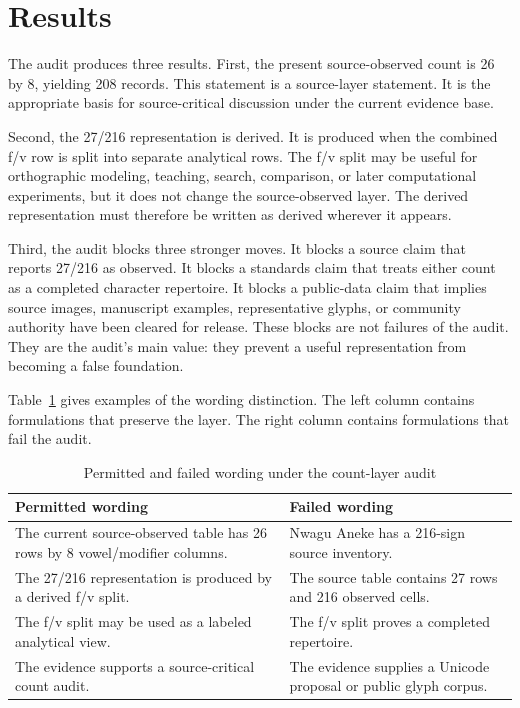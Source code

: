 \documentclass[sigconf,nonacm]{acmart}
\begin{document}
\section{Results}
The audit produces three results. First, the present source-observed count is
26 by 8, yielding 208 records. This statement is a source-layer statement. It is
the appropriate basis for source-critical discussion under the current evidence
base.

Second, the 27/216 representation is derived. It is produced when the combined
f/v row is split into separate analytical rows. The f/v split may be useful for
orthographic modeling, teaching, search, comparison, or later computational
experiments, but it does not change the source-observed layer. The derived
representation must therefore be written as derived wherever it appears.

Third, the audit blocks three stronger moves. It blocks a source claim that
reports 27/216 as observed. It blocks a standards claim that treats either count
as a completed character repertoire. It blocks a public-data claim that implies
source images, manuscript examples, representative glyphs, or community
authority have been cleared for release. These blocks are not failures of the
audit. They are the audit's main value: they prevent a useful representation
from becoming a false foundation.

Table~\ref{tab:permitted_wording} gives examples of the wording distinction.
The left column contains formulations that preserve the layer. The right column
contains formulations that fail the audit.

\begin{table}[t]
\caption{Permitted and failed wording under the count-layer audit}
\label{tab:permitted_wording}
\begin{tabular}{p{}p{}}
\toprule
Permitted wording & Failed wording \\
\midrule
The current source-observed table has 26 rows by 8 vowel/modifier columns. &
Nwagu Aneke has a 216-sign source inventory. \\
The 27/216 representation is produced by a derived f/v split. &
The source table contains 27 rows and 216 observed cells. \\
The f/v split may be used as a labeled analytical view. &
The f/v split proves a completed repertoire. \\
The evidence supports a source-critical count audit. &
The evidence supplies a Unicode proposal or public glyph corpus. \\
\bottomrule
\end{tabular}
\end{table}
\end{document}
